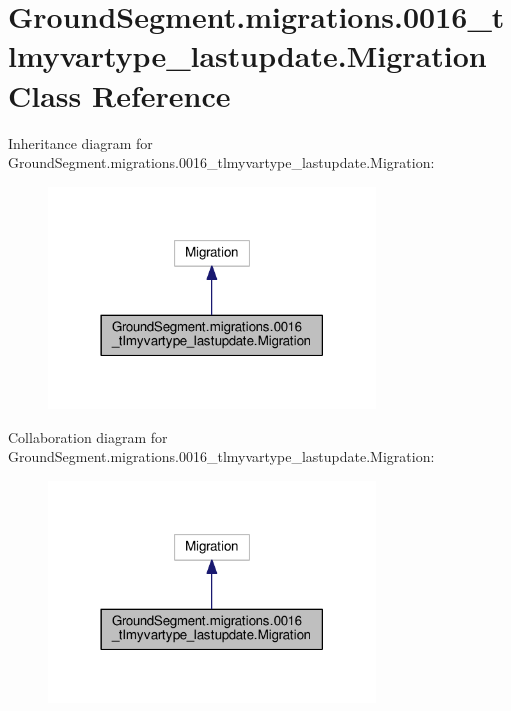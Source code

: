 \hypertarget{class_ground_segment_1_1migrations_1_10016__tlmyvartype__lastupdate_1_1_migration}{}\section{Ground\+Segment.\+migrations.0016\+\_\+tlmyvartype\+\_\+lastupdate.Migration Class Reference}
\label{class_ground_segment_1_1migrations_1_10016__tlmyvartype__lastupdate_1_1_migration}


Inheritance diagram for Ground\+Segment.\+migrations.0016\+\_\+tlmyvartype\+\_\+lastupdate.Migration\+:\nopagebreak
\begin{figure}[H]
\begin{center}
\leavevmode
\includegraphics[width=246pt]{class_ground_segment_1_1migrations_1_10016__tlmyvartype__lastupdate_1_1_migration__inherit__graph}
\end{center}
\end{figure}


Collaboration diagram for Ground\+Segment.\+migrations.0016\+\_\+tlmyvartype\+\_\+lastupdate.Migration\+:\nopagebreak
\begin{figure}[H]
\begin{center}
\leavevmode
\includegraphics[width=246pt]{class_ground_segment_1_1migrations_1_10016__tlmyvartype__lastupdate_1_1_migration__coll__graph}
\end{center}
\end{figure}
